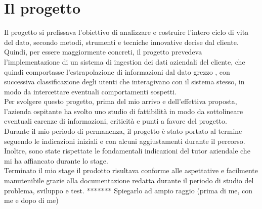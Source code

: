 \section{Il progetto}
Il progetto si prefissava l'obiettivo di analizzare e costruire l'intero ciclo di vita del dato, secondo metodi, strumenti e tecniche innovative decise dal cliente.
\\
Quindi, per essere maggiormente concreti, il progetto prevedeva l'implementazione di un sistema di \gls{ingestion} dei dati aziendali del cliente, che quindi comportasse l'estrapolazione di informazioni dal dato grezzo , con successiva classificazione degli utenti che interagivano con il sistema stesso, in modo da intercettare eventuali comportamenti sospetti.
\\
Per svolgere questo progetto, prima del mio arrivo e dell'effettiva proposta, l'azienda ospitante ha svolto uno studio di fattibilità in modo da sottolineare eventuali carenze di informazioni, criticità e punti a favore del progetto.
\\
Durante il mio periodo di permanenza, il progetto è stato portato al termine seguendo le indicazioni iniziali e con alcuni aggiustamenti durante il percorso. Inoltre, sono state rispettate le fondamentali indicazioni del tutor aziendale che mi ha affiancato durante lo stage.
\\
Terminato il mio stage il prodotto risultava conforme alle aspettative e facilmente manutenibile grazie alla documentazione redatta durante il periodo di studio del problema, sviluppo e test.
*******
Spiegarlo ad ampio raggio (prima di me, con me e dopo di me)
